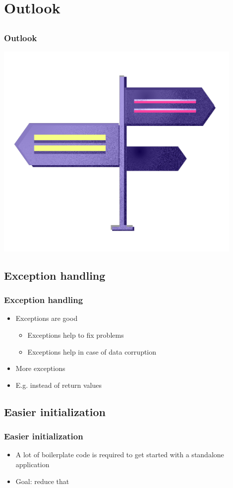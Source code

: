 \section{Outlook}


\subsection{}
\begin{frame}
\frametitle{Outlook}
	\includegraphics[width=0.9\textwidth]{img/plan.png}
\end{frame}

\subsection{Exception handling}
\begin{frame}
\frametitle{Exception handling}
\begin{itemize}
	\item Exceptions are good
	\begin{itemize}
		\item Exceptions help to fix problems
		\item Exceptions help in case of data corruption	
	\end{itemize}
	\item More exceptions
	\item E.g. instead of return values
\end{itemize}
\end{frame}

\subsection{Easier initialization}
\begin{frame}
\frametitle{Easier initialization}
\begin{itemize}
	\item A lot of boilerplate code is required to get started with a standalone application
	\item Goal: reduce that
\end{itemize}
\end{frame}

